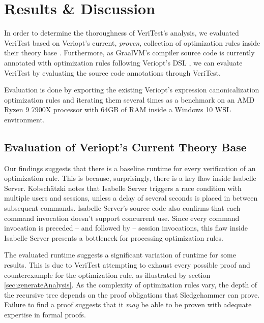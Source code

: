 \chapter{Results \& Discussion \label{sec:results}}

In order to determine the thoroughness of VeriTest's analysis, we evaluated VeriTest based on Veriopt's current, \emph{proven}, collection of 
optimization rules inside their theory base \cite{Term_Graph_Optimizations}. Furthermore, as GraalVM's compiler source code is currently annotated 
with optimization rules following Veriopt's DSL \cite[Sec. 5.1]{Term_Graph_Optimizations}, we can evaluate VeriTest by evaluating the source 
code annotations through VeriTest.

Evaluation is done by exporting the existing Veriopt's expression canonicalization optimization rules and iterating them several times as 
a benchmark on an AMD Ryzen 9 7900X processor with 64GB of RAM inside a Windows 10 WSL environment.

\section{Evaluation of Veriopt's Current Theory Base}


Our findings suggests that there is a baseline runtime for every verification of an optimization rule. This is because, surprisingly, there is a 
key flaw inside Isabelle Server. Kobschätzki \cite{kobschatzki_unexpected_2024} notes that Isabelle Server triggers a race condition with multiple 
users and sessions, unless a delay of several seconds is placed in between subsequent commands. Isabelle Server's source code also confirms that 
each command invocation doesn't support concurrent use. Since every command invocation is preceded -- and followed by -- session invocations, 
this flaw inside Isabelle Server presents a bottleneck for processing optimization rules.


The evaluated runtime suggests a significant variation of runtime for some results.
This is due to VeriTest attempting to exhaust every possible proof and counterexample for the optimization rule, as illustrated by section 
\ref{sec:generateAnalysis}. As the complexity of optimization rules vary, the depth of the recursive tree depends on the proof obligations that 
Sledgehammer can prove. Failure to find a proof suggests that it \emph{may} be able to be proven with adequate expertise in formal proofs.

